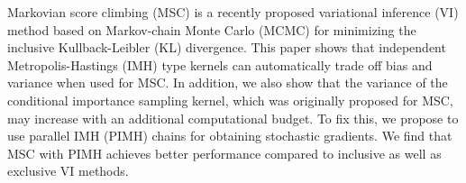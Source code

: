 
Markovian score climbing (MSC) is a recently proposed variational inference (VI) method based on Markov-chain Monte Carlo (MCMC) for minimizing the inclusive Kullback-Leibler (KL) divergence.
This paper shows that independent Metropolis-Hastings (IMH) type kernels can automatically trade off bias and variance when used for MSC.
In addition, we also show that the variance of the conditional importance sampling kernel, which was originally proposed for MSC, may increase with an additional computational budget.
To fix this, we propose to use parallel IMH (PIMH) chains for obtaining stochastic gradients.
We find that MSC with PIMH achieves better performance compared to inclusive as well as exclusive VI methods.

